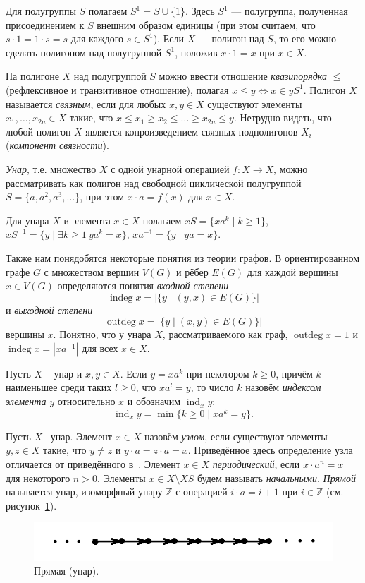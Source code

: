 \documentclass[11pt,twoside,final
]{article}
\def\indeg{\operatorname{indeg}}
\def\outdeg{\operatorname{outdeg}}
\def\ind{\operatorname{ind}}
\begin{document}
Для полугруппы $S$ полагаем $S^1 = S \cup \{ 1 \}$.
Здесь $S^1$ — полугруппа, полученная присоединением к $S$ внешним образом единицы (при этом считаем, что $s \cdot 1 = 1 \cdot s = s$ для каждого $s \in S^1$).
Если $X$ — полигон над $S$, то его можно сделать полигоном над полугруппой $S^1$, положив $x \cdot 1 = x$ при $x \in X$.

На полигоне $X$ над полугруппой $S$ можно ввести отношение \textit{квазипорядка} $\leqslant$ (рефлексивное и транзитивное отношение), полагая $x \leqslant y \Leftrightarrow x \in yS^1$.
Полигон $X$ называется \textit{связным}, если для любых $x,y \in X$ существуют элементы $x_1,\ldots,x_{2n} \in X$ такие, что  $ x \leqslant x_1 \geqslant x_2 \leqslant \ldots \geqslant x_{2n} \leqslant y$.
Нетрудно видеть, что любой полигон $X$ является копроизведением связных подполигонов $X_i$ (\textit{компонент связности}).

\textit{Унар}, т.е. множество $X$ с одной унарной операцией $f: X \to X$, можно рассматривать как полигон над свободной циклической полугруппой $S = \{ a,a^{2},a^{3},\ldots\}$, при этом $x \cdot a = f(x)$ для $x \in X$.

Для унара $X$ и элемента $x \in X$ полагаем $xS = \{ xa^k \mid k \geqslant 1 \}$, $xS^{-1} = \{ y \mid \exists k \geqslant 1 \ y a^k = x \}$, $xa^{-1} = \{ y \mid ya = x \}$.

Также нам понядобятся некоторые понятия из теории графов.
В ориентированном графе $G$ с множеством вершин $V(G)$ и рёбер $E(G)$ для каждой вершины $x \in V(G)$ определяются понятия \textit{входной степени}
\[
	\indeg x = |\{ y \mid (y,x) \in E(G) \}|
\]
и \textit{выходной степени}
\[
	\outdeg x = |\{ y \mid (x,y) \in E(G) \}|
\]
вершины $x$.
Понятно, что у унара $X$, рассматриваемого как граф, $\outdeg x = 1$ и $\indeg x = |xa^{-1}|$ для всех $x \in X$.

Пусть $X$ -- унар и $x,y \in X$. Если $y = x a^k$ при некотором $k \geqslant 0$, причём $k$ -- наименьшее среди таких $l \geqslant 0$, что $x a^l = y$, то число $k$ назовём \textit{индексом элемента} $y$ относительно $x$ и обозначим $\ind_x y$: $$ \ind_x y = \min \{ k \geqslant 0 \mid xa^k = y \}. $$

Пусть $X$-- унар.
Элемент $x \in X$ назовём \textit{узлом}, если существуют элементы $y,z \in X$ такие, что $y \neq z$ и $y \cdot a = z \cdot a = x$.
Приведённое здесь определение узла отличается от приведённого в~\cite{Kozhukhov_8}.
Элемент $x \in X$ \textit{периодический}, если $x \cdot a^n = x$ для некоторого $n > 0$.
Элементы $x \in X \setminus XS$ будем называть \textit{начальными}.
\textit{Прямой} называется унар, изоморфный унару $\mathbb{Z}$ с операцией $i \cdot a = i + 1$ при $i \in \mathbb{Z}$ (см. рисунок~\ref{fig:line}).
\begin{figure}[ht!]
	\centering
	\includegraphics[scale=0.6]{img/line.png}
	\caption{Прямая (унар).}
	\label{fig:line}
\end{figure}
\end{document}
